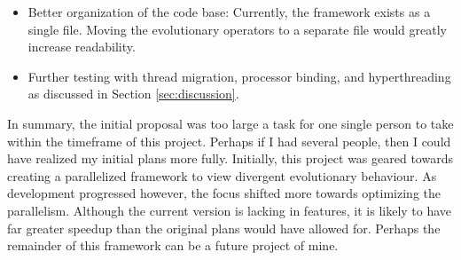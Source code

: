 \documentclass[10pt,letterpaper]{article}
\begin{document}
\begin{itemize}
\item Better organization of the code base: Currently, the framework exists as a single file. Moving the evolutionary operators to a separate file would greatly increase readability.
\item Further testing with thread migration, processor binding, and hyperthreading as discussed in Section \ref{sec:discussion}.
\end{itemize}

\newpage
In summary, the initial proposal was too large a task for one single person to take within the timeframe of this project. Perhaps if I had several people, then I could have realized my initial plans more fully. Initially, this project was geared towards creating a parallelized framework to view divergent evolutionary behaviour. As development progressed however, the focus shifted more towards optimizing the parallelism. Although the current version is lacking in features, it is likely to have far greater speedup than the original plans would have allowed for. Perhaps the remainder of this framework can be a future project of mine.


\end{document}
